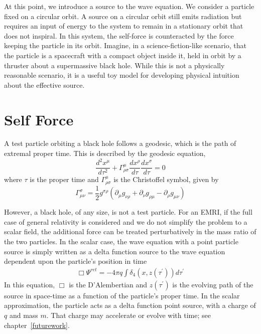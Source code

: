 At this point, we introduce a source to the wave equation. We consider a particle fixed on a circular orbit. A source on a circular orbit still emits radiation but requires an input of energy to the system to remain in a stationary orbit that does not inspiral. In this system, the self-force is counteracted by the force keeping the particle in its orbit. Imagine, in a science-fiction-like scenario, that the particle is a spacecraft with a compact object inside it, held in orbit by a thruster about a supermassive black hole. While this is not a physically reasonable scenario, it is a useful toy model for developing physical intuition about the effective source. 

\section{Self Force}




A test particle orbiting a black hole follows a geodesic, which is the path of extremal proper time. This is described by the geodesic equation,
\begin{equation}
\frac{d^2x^\mu}{d\tau^2}+\Gamma^\mu_{\rho\sigma}\frac{dx^\rho}{d\tau}\frac{dx^\sigma}{d\tau}=0
\end{equation}
where $\tau$ is the proper time and $\Gamma^\mu_{\rho\sigma}$ is the Christoffel symbol, given by~\cite{Carroll}
\begin{equation}
\Gamma^\sigma_{\mu\nu}=\frac{1}{2}g^{\sigma\rho}(\partial_\mu g_{\nu\rho}+\partial_\nu g_{\rho\mu} - \partial_\rho g_{\mu\nu})
\end{equation}

However, a black hole, of any size, is not a test particle. For an EMRI, if the full case of general relativity is considered and we do not simplify the problem to a scalar field, the additional force can be treated perturbatively in the mass ratio of the two particles. In the scalar case, the wave equation with a point particle source is simply written as a delta function source to the wave equation dependent upon the particle's position in time~\cite{WardellSelfForceReview}
\begin{eqnarray}
  \Box\Psi^{ret}=-4\pi q\int\delta_4(x,z(\tau^\prime))d\tau^\prime
\end{eqnarray}
In this equation, $\Box$ is the D'Alembertian and $z(\tau^\prime)$ is the evolving path of the source in space-time as a function of the particle's proper time. In the scalar approximation, the particle acts as a delta function point source, with a charge of $q$ and mass $m$. That charge may accelerate or evolve with time; see chapter~\ref{futurework}. 

